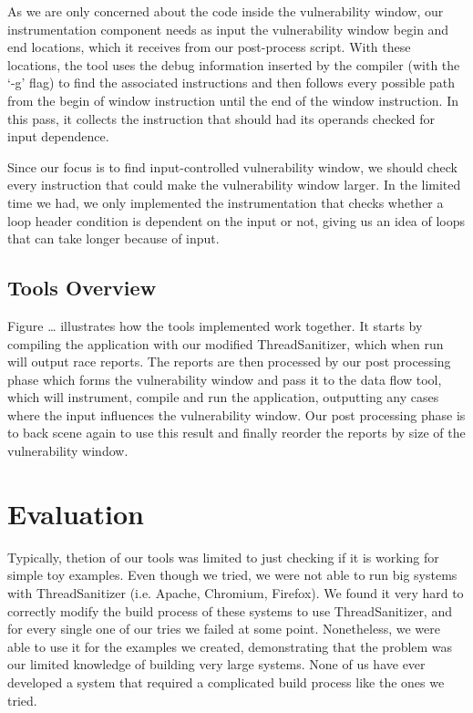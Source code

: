 \documentclass{acm_proc_article-sp}
\begin{document}
	As we are only concerned about the code inside the vulnerability window, our instrumentation component needs as input the vulnerability window begin and end locations, which it receives from our post-process script. With these locations, the tool uses the debug information inserted by the compiler (with the ‘-g’ flag) to find the associated instructions and then follows every possible path from the begin of window instruction until the end of the window instruction. In this pass, it collects the instruction that should had its operands checked for input dependence.

	Since our focus is to find input-controlled vulnerability window, we should check every instruction that could make the vulnerability window larger. In the limited time we had, we only implemented the instrumentation that checks whether a loop header condition is dependent on the input or not, giving us an idea of loops that can take longer because of input.

\subsection{Tools Overview}
Figure … illustrates how the tools implemented work together. It starts by compiling the application with our modified ThreadSanitizer, which when run will output race reports. The reports are then processed by our post processing phase which forms the vulnerability window and pass it to the data flow tool, which will instrument, compile and run the application, outputting any cases where the input influences the vulnerability window. Our post processing phase is to back scene again to use this result and finally reorder the reports by size of the vulnerability window.

\section{Evaluation}
Typically, thetion of our tools was limited to just checking if it is working for simple toy examples. Even though we tried, we were not able to run big systems with ThreadSanitizer (i.e. Apache, Chromium, Firefox). We found it very hard to correctly modify the build process of these systems to use ThreadSanitizer, and for every single one of our tries we failed at some point. Nonetheless, we were able to use it for the examples we created, demonstrating that the problem was our limited knowledge of building very large systems. None of us have ever developed a system that required a complicated build process like the ones we tried.
\end{document}
